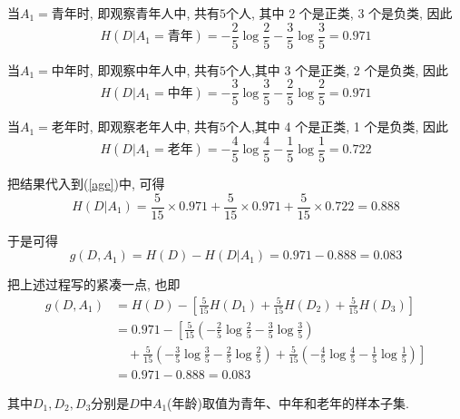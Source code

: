 \documentclass[a4paper,UTF8]{ctexart}
\theoremstyle{plain} \newtheorem{theorem}{定理}[section]
\theoremstyle{plain} \newtheorem{definition}{定义}[section]
\theoremstyle{plain} \newtheorem{lemma}{引理}[section]
\theoremstyle{plain} \newtheorem{proposition}{命题}[section]
\theoremstyle{plain} \newtheorem{example}{例}
\theoremstyle{plain} \newtheorem{remark}{注}
\theoremstyle{plain} \newtheorem{corollary}{推论}[section]
\begin{document}
当$A_{1} = \textrm{青年}$时, 即观察青年人中, 共有$5$个人, 其中 2 个是正类, 3 个是负类, 因此
\begin{equation*}
H(D|A_{1} = \textrm{青年}) = - \frac{2}{5} \log \frac{2}{5} - \frac{3}{5} \log \frac{3}{5} = 0.971
\end{equation*}

当$A_{1} = \textrm{中年}$时, 即观察中年人中, 共有$5$个人,其中 3 个是正类, 2 个是负类, 因此
\begin{equation*}
H(D | A_{1} = \textrm{中年}) = - \frac{3}{5} \log \frac{3}{5} - \frac{2}{5} \log \frac{2}{5} = 0.971
\end{equation*}

当$A_{1} = \textrm{老年}$时, 即观察老年人中, 共有$5$个人,其中 4 个是正类, 1 个是负类, 因此
\begin{equation*}
H(D | A_{1} = \textrm{老年}) = - \frac{4}{5} \log \frac{4}{5} - \frac{1}{5} \log \frac{1}{5} = 0.722
\end{equation*}

把结果代入到(\ref{age})中, 可得
\begin{equation*}
H(D | A_{1}) = \frac{5}{15} \times 0.971 + \frac{5}{15} \times 0.971 + \frac{5}{15} \times 0.722 = 0.888
\end{equation*}

于是可得
\begin{equation*}
g(D, A_{1}) = H(D) - H(D | A_{1}) = 0.971 - 0.888 = 0.083
\end{equation*}

把上述过程写的紧凑一点, 也即
\begin{align*}
g(D, A_{1}) & = H(D) - \left[ \frac{5}{15} H(D_{1}) + \frac{5}{15} H(D_{2}) + \frac{5}{15} H(D_{3}) \right] \\ 
& = 0.971 - \left[ \frac{5}{15} \left( - \frac{2}{5} \log \frac{2}{5} - \frac{3}{5} \log \frac{3}{5} \right) \right. \\ 
& \quad + \left. \frac{5}{15} \left( - \frac{3}{5} \log \frac{3}{5} - \frac{2}{5} \log \frac{2}{5} \right) + \frac{5}{15} \left( - \frac{4}{5} \log \frac{4}{5} - \frac{1}{5} \log \frac{1}{5} \right) \right] \\ 
& = 0.971 - 0.888 = 0.083
\end{align*}

其中$D_{1}, D_{2}, D_{3}$分别是$D$中$A_{1}$(年龄)取值为青年、中年和老年的样本子集.
\end{document}
